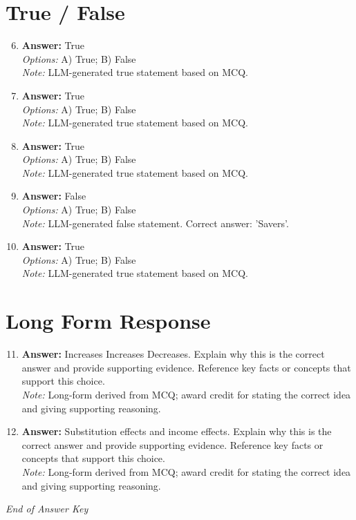 \documentclass[12pt]{article}
\begin{document}
\section*{True / False}
\begin{enumerate}[label=\arabic*.]
\setcounter{enumi}{5}
\item \textbf{Answer:} True
\\ \textit{Options:} A) True; B) False
\\ \textit{Note:} LLM-generated true statement based on MCQ.
\item \textbf{Answer:} True
\\ \textit{Options:} A) True; B) False
\\ \textit{Note:} LLM-generated true statement based on MCQ.
\item \textbf{Answer:} True
\\ \textit{Options:} A) True; B) False
\\ \textit{Note:} LLM-generated true statement based on MCQ.
\item \textbf{Answer:} False
\\ \textit{Options:} A) True; B) False
\\ \textit{Note:} LLM-generated false statement. Correct answer: 'Savers'.
\item \textbf{Answer:} True
\\ \textit{Options:} A) True; B) False
\\ \textit{Note:} LLM-generated true statement based on MCQ.
\end{enumerate}

\section*{Long Form Response}
\begin{enumerate}[label=\arabic*.]
\setcounter{enumi}{10}
\item \textbf{Answer:} Increases Increases Decreases. Explain why this is the correct answer and provide supporting evidence. Reference key facts or concepts that support this choice.
\\ \textit{Note:} Long-form derived from MCQ; award credit for stating the correct idea and giving supporting reasoning.
\item \textbf{Answer:} Substitution effects and income effects. Explain why this is the correct answer and provide supporting evidence. Reference key facts or concepts that support this choice.
\\ \textit{Note:} Long-form derived from MCQ; award credit for stating the correct idea and giving supporting reasoning.
\end{enumerate}

\vfill
\noindent\textit{End of Answer Key}
\end{document}
